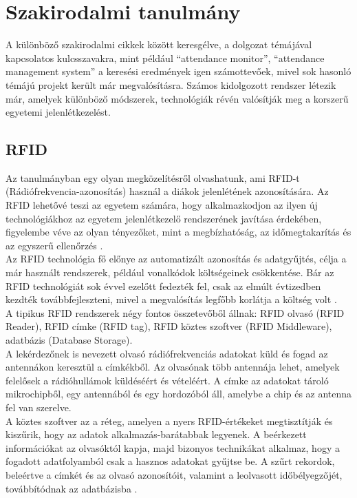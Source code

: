 \documentclass[12pt]{article}
\numberwithin{figure}{section}
\numberwithin{equation}{section}
\begin{document}
\newpage

\section{Szakirodalmi tanulmány}
A különböző szakirodalmi cikkek között keresgélve, a dolgozat témájával kapcsolatos kulcsszavakra, mint például \enquote{attendance monitor}, \enquote{attendance management system} a keresési eredmények igen számottevőek, mivel sok hasonló témájú projekt került már megvalósításra. Számos kidolgozott rendszer létezik már, amelyek különböző módszerek, technológiák révén valósítják meg a korszerű egyetemi jelenlétkezelést.

\subsection{RFID}
Az \cite{1} tanulmányban egy olyan megközelítésről olvashatunk, ami RFID-t  (Rádiófrekvencia-azonosítás) használ a diákok jelenlétének azonosítására. Az RFID lehetővé teszi az egyetem számára, hogy alkalmazkodjon az ilyen új technológiákhoz az egyetem jelenlétkezelő rendszerének javítása érdekében, figyelembe véve az olyan tényezőket, mint a megbízhatóság, az időmegtakarítás és az egyszerű ellenőrzés \cite{3}.  \\
Az RFID technológia fő előnye az automatizált azonosítás és adatgyűjtés, célja a már használt rendszerek, például vonalkódok költségeinek csökkentése. Bár az RFID technológiát sok évvel ezelőtt fedezték fel, csak az elmúlt évtizedben kezdték továbbfejleszteni, mivel a megvalósítás legfőbb korlátja a költség volt \cite{2}. \\
A tipikus RFID rendszerek négy fontos összetevőből állnak: RFID olvasó (RFID Reader), RFID címke (RFID tag), RFID köztes szoftver (RFID Middleware), adatbázis (Database Storage).\\
A lekérdezőnek is nevezett olvasó rádiófrekvenciás adatokat küld és fogad az antennákon keresztül a címkékből. Az olvasónak több antennája lehet, amelyek felelősek a rádióhullámok küldéséért és vételéért. A címke az adatokat tároló mikrochipből, egy antennából és egy hordozóból áll, amelybe a chip és az antenna fel van szerelve.\\
A köztes szoftver az a réteg, amelyen a nyers RFID-értékeket megtisztítják és kiszűrik, hogy az adatok alkalmazás-barátabbak legyenek. A beérkezett információkat az olvasóktól kapja, majd bizonyos technikákat alkalmaz, hogy a fogadott adatfolyamból csak a hasznos adatokat gyűjtse be. A szűrt rekordok, beleértve a címkét és az olvasó azonosítóit, valamint a leolvasott időbélyegzőjét, továbbítódnak az adatbázisba \cite{1}.  \\
\end{document}
